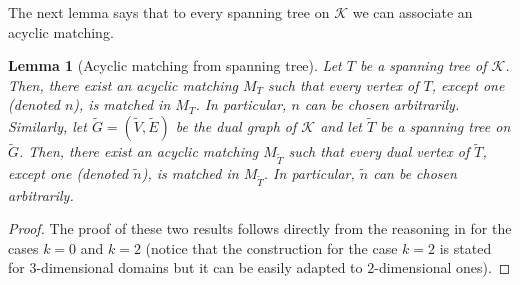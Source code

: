 \documentclass[a4paper,twoside,10pt]{article}
\theoremstyle{plain}
\newtheorem{lemma}{Lemma}
\theoremstyle{definition}
\theoremstyle{remark}
\newcommand{\mc}{\mathcal}
\newcommand{\K}{\mc{K}}
\newcommand{\dual}[1]{\tilde{#1}}
\begin{document}
The next lemma says that to every spanning tree on $\K$ we can associate an acyclic matching.
\begin{lemma}[Acyclic matching from spanning tree]
\label{lem:tree.acyclic}
Let $T$ be a spanning tree of $\K$.
Then, there exist an acyclic matching $M_T$ such that every vertex of $T$, except one (denoted $n$), is matched in $M_T$.
In particular, $n$ can be chosen arbitrarily. 
Similarly, let $\dual G=(\dual V, \dual E)$ be the dual graph of $\K$ and let $\dual T$ be a spanning tree on $\dual G$.
Then, there exist an acyclic matching $M_{\dual T}$ such that every dual vertex of $\dual T$, except one (denoted $\dual n$), is matched in $M_{\dual T}$.
In particular, $\dual n$ can be chosen arbitrarily. 
\end{lemma}
\begin{proof}
The proof of these two results follows directly from the reasoning in \cite[Section 4.2]{pitassi2022inverting} for the cases $k=0$ and $k=2$ (notice that the construction for the case $k=2$ is stated for $3$-dimensional domains but it can be easily adapted to $2$-dimensional ones).
\end{proof}
\end{document}

